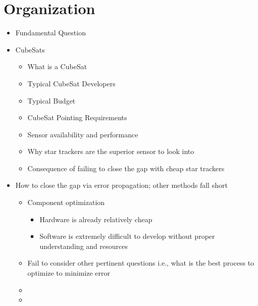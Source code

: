\section{Organization}
\begin{itemize}
    \item Fundamental Question
    \item CubeSats
    \begin{itemize}
        \item What is a CubeSat
        \item Typical CubeSat Developers
        \item Typical Budget
        \item CubeSat Pointing Requirements 
        \item Sensor availability and performance 
        \item Why star trackers are the superior sensor to look into 
        \item Consequence of failing to close the gap with cheap star trackers 
    \end{itemize}
    \item How to close the gap via error propagation; other methods fall short
    \begin{itemize}
        \item Component optimization
        \begin{itemize}
            \item Hardware is already relatively cheap
            \item Software is extremely difficult to develop without proper understanding and resources
        \end{itemize}
        \item Fail to consider other pertinent questions i.e., what is the best process to optimize to minimize error 
        \item 
        \item 
    \end{itemize}
\end{itemize}
